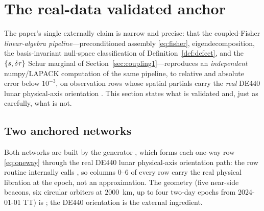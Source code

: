 \section{The real-data validated anchor}
\label{sec:anchor}

The paper's single externally \Validated{} claim is narrow and precise: that the
coupled-Fisher \emph{linear-algebra pipeline}---preconditioned assembly
\eqref{eq:fisher}, eigendecomposition, the basis-invariant null-space classification of
Definition~\ref{def:defect}, and the $\{s,\delta\tau\}$ Schur marginal of
Section~\ref{sec:coupling1}---reproduces an \emph{independent} numpy/LAPACK computation of
the same pipeline, to relative and absolute error below $10^{-3}$, on observation rows
whose spatial partials carry the \emph{real} DE440 lunar physical-axis orientation
\citep{park2021de440}. This section states what is validated and, just as carefully, what
is not.

\subsection{Two anchored networks}
\label{sec:networks}

Both networks are built by the generator , which forms
each one-way row \eqref{eq:oneway} through the real DE440 lunar physical-axis orientation
path: the row routine  internally calls
, so columns $0$--$6$ of every row carry the real
physical libration at the epoch, not an approximation. The geometry (five near-side beacons,
six circular orbiters at $2000$~km, up to four two-day epochs from 2024-01-01 TT) is
\Modelled{}; the DE440 orientation is the external ingredient.

